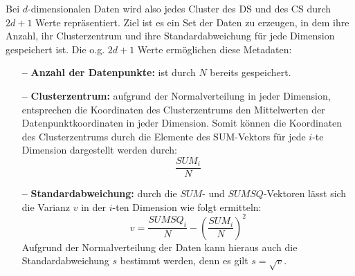 \documentclass[a4paper,12pt,twoside]{article}
\begin{document}
Bei $ d $-dimensionalen Daten wird also jedes Cluster des DS und des CS durch $ 2d + 1 $ Werte repräsentiert. Ziel ist es ein Set der Daten zu erzeugen, in dem ihre Anzahl, ihr Clusterzentrum und ihre Standardabweichung für jede Dimension gespeichert ist. Die o.g. $ 2d + 1 $ Werte ermöglichen diese Metadaten:
\begin{itemize}
	\item[\textbf{--}] \textbf{Anzahl der Datenpunkte:} ist durch $ N $ bereits gespeichert.
	\item[\textbf{--}] \textbf{Clusterzentrum:} aufgrund der Normalverteilung in jeder Dimension, entsprechen die Koordinaten des Clusterzentrums den Mittelwerten der Datenpunktkoordinaten in jeder Dimension. Somit können die Koordinaten des Clusterzentrums durch die Elemente des SUM-Vektors für jede $ i $-te Dimension dargestellt werden durch:  \[\frac{SUM_{i}}{N} \]
	\item[\textbf{--}] \textbf{Standardabweichung:} durch die $ SUM $- und $ SUMSQ $-Vektoren lässt sich die Varianz $v$ in der $i$-ten Dimension wie folgt ermitteln:
	\[ v = \frac{SUMSQ_{i}}{N}-\left(\frac{SUM_{i}}{N}\right)^2 \] 
	Aufgrund der Normalverteilung der Daten kann hieraus auch die Standardabweichung $ s $ bestimmt werden, denn es gilt
	$s = \sqrt{v}$.
\end{itemize}
\end{document}
